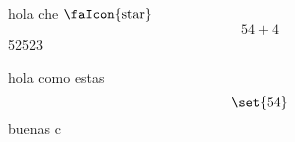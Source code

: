 




hola che 
$\text{\faIcon{star}}$ %
    \[54 + 4\]
    52523
    
    
    hola como estas 
    \[ \set{54} \]
buenas c



